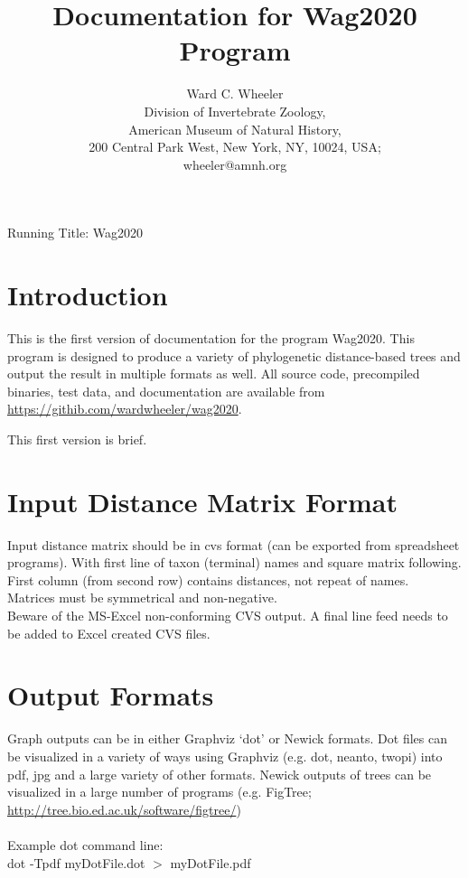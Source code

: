 \documentclass[11pt]{memoir}
\begin{document}
	
	\title{Documentation for Wag2020 Program}
	\author{Ward C. Wheeler\\
		Division of Invertebrate Zoology,\\ American Museum of Natural History,\\ 200 Central Park West, New York, NY, 10024, USA;\\wheeler@amnh.org}
	
	
	\maketitle
	\begin{center}
		Running Title: Wag2020
	\end{center}
	\newpage
	
	
	\section{Introduction}
	This is the first version of documentation for the program Wag2020.  This program is designed to produce a variety of 
	phylogenetic distance-based  trees and output the result in multiple formats as well.
	All source code, precompiled binaries, test data, and documentation are available from \url{https://githib.com/wardwheeler/wag2020}.
	
	This first version is brief.
	
	\section{Input Distance Matrix Format}
	Input distance matrix should be in cvs format (can be exported from spreadsheet programs).  With first line of
	taxon (terminal) names and square matrix following.  First column (from second row) contains distances, not repeat of names.\\
	
	\noindent Matrices must be symmetrical and non-negative.\\
	
	\noindent Beware of the MS-Excel
	non-conforming CVS output.  A final line feed needs to be added to Excel created CVS files.
	
	\section{Output Formats}
	Graph outputs can be in either Graphviz `dot' or Newick formats.  Dot files can be visualized in a variety of ways 
	using Graphviz (e.g. dot, neanto, twopi) into pdf, jpg and a large variety of other formats. Newick outputs of trees 
	can be visualized in a 
	large number of programs (e.g. FigTree; \url{http://tree.bio.ed.ac.uk/software/figtree/})\\ 
	\\
	Example dot command line: \\
		dot -Tpdf myDotFile.dot $>$ myDotFile.pdf\\
	
\end{document}
